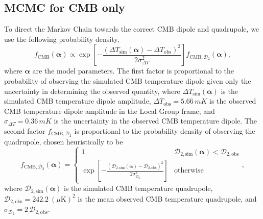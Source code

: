 \documentclass[a4paper,12pt]{report}
\renewcommand{\vec}[1]{\ensuremath{\bm{#1}}}
\begin{document}
\subsection{MCMC for CMB only}
To direct the Markov Chain towards the correct CMB dipole and quadrupole, we use the following probability density,
\begin{equation} \label{eqn: CMB probability distribution}
    f_{\text{CMB}}(\vec{\alpha}) \propto \exp{\left[-\frac{(\Delta T_{\text{sim}}(\vec{\alpha}) - \Delta T_{\text{obs}})^2}{2\sigma_{\Delta T}^2}\right]} f_{\text{CMB}, \mathcal{D}_2}(\vec{\alpha}),
\end{equation}
where $\vec{\alpha}$ are the model parameters. The first factor is proportional to the probability of observing the simulated CMB temperature dipole given only the uncertainty in determining the observed quantity, where $\Delta T_{\text{sim}}(\vec{\alpha})$ is the simulated CMB temperature dipole amplitude, $\Delta T_{\text{obs}} = 5.66\, \si{mK}$ is the observed CMB temperature dipole amplitude in the Local Group frame, and $\sigma_{\Delta T} = 0.36\, \si{mK}$ is the uncertainty in the observed CMB temperature dipole. The second factor $f_{\text{CMB}, \mathcal{D}_2}$ is proportional to the probability density of observing the quadrupole, chosen heuristically to be
\begin{equation}
    f_{\text{CMB}, \mathcal{D}_2}(\vec{\alpha}) =
    \begin{cases}
        1 & \mathcal{D}_{2, \text{sim}} (\vec{\alpha}) < \mathcal{D}_{2, \text{obs}} \\
        \exp\left[-\frac{(\mathcal{D}_{2, \text{sim}} (\vec{\alpha}) - \mathcal{D}_{2, \text{obs}})^2}{2\sigma_{\mathcal{D}_2}^2}\right] & \text{otherwise}
    \end{cases},
\end{equation}
where $\mathcal{D}_{2, \text{sim}} (\vec{\alpha})$ is the simulated CMB temperature quadrupole, $\mathcal{D}_{2, \text{obs}} = 242.2\: (\mu\text{K})^2$ is the mean observed CMB temperature quadrupole, and $\sigma_{\mathcal{D}_2} = 2\,\mathcal{D}_{2, \text{obs}}$.
\end{document}
